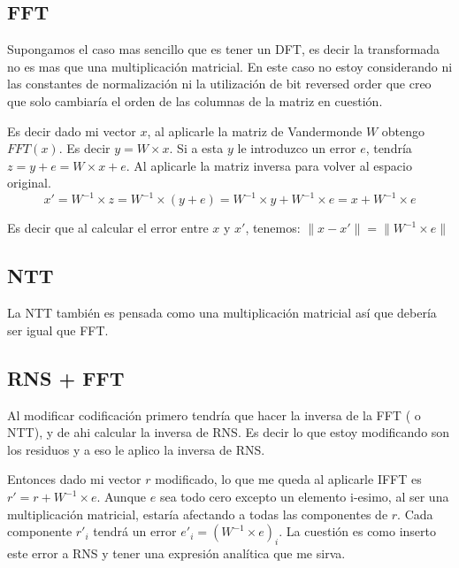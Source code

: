 \documentclass[12pt, oneside]{article}
\begin{document}
\subsection{FFT}

Supongamos el caso mas sencillo que es tener un DFT, es decir la transformada no es mas que una
multiplicación matricial.
En este caso no estoy considerando ni las constantes de normalización ni la utilización de bit reversed order que
creo que solo cambiaría el orden de las columnas de la matriz en cuestión.

Es decir dado mi vector $x$, al aplicarle la matriz de Vandermonde $W$ obtengo $FFT(x)$.
Es decir $ y = W \times x$.
Si a esta $y$ le introduzco un error $e$, tendría $z = y + e = W\times x + e$.
Al aplicarle la matriz inversa para volver al espacio original.
\begin{equation*}
    x' = W^{-1}\times z = W^{-1}\times (y+e) = W^{-1}\times y + W^{-1}\times e = x + W^{-1}\times e
\end{equation*}

Es decir que al calcular el error entre $x$ y $x'$, tenemos:
$\lVert x-x' \rVert = \lVert W^{-1} \times e \rVert$

\subsection {NTT}
La NTT también es pensada como una multiplicación matricial así que debería  ser igual que FFT.

\subsection{RNS + FFT}
Al modificar codificación primero tendría que hacer la inversa de la FFT ( o NTT), y de ahi calcular la
inversa de RNS.
Es decir lo que estoy modificando son los residuos y a eso le aplico la inversa de RNS.

Entonces dado mi vector $r$ modificado, lo que me queda al aplicarle IFFT es  $r' = r + W^{-1}\times e$.
Aunque $e$ sea todo cero excepto un elemento i-esimo, al ser una multiplicación matricial,
estaría afectando a todas las componentes de $r$.
Cada componente $r'_i$ tendrá un error $e'_i = (W^{-1}\times e)_i$.
La cuestión es como inserto este error a RNS y tener una expresión analítica que me sirva.
\end{document}
